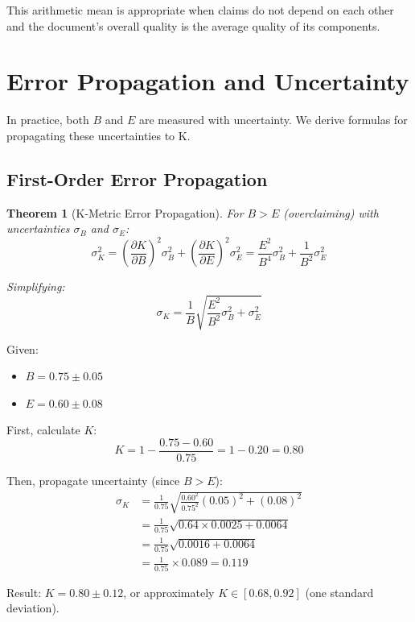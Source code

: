 \documentclass[11pt,a4paper]{article}
\newtheorem{theorem}{Theorem}[section]
\theoremstyle{remark}
\begin{document}
This arithmetic mean is appropriate when claims do not depend on each other and the document's overall quality is the average quality of its components.


\section{Error Propagation and Uncertainty}
\label{sec:error}

In practice, both $B$ and $E$ are measured with uncertainty. We derive formulas for propagating these uncertainties to K.

\subsection{First-Order Error Propagation}

\begin{theorem}[K-Metric Error Propagation]
\label{thm:error}
For $B > E$ (overclaiming) with uncertainties $\sigma_B$ and $\sigma_E$:
\begin{equation}
\sigma_K^2 = \left( \frac{\partial K}{\partial B} \right)^2 \sigma_B^2 + \left( \frac{\partial K}{\partial E} \right)^2 \sigma_E^2 = \frac{E^2}{B^4} \sigma_B^2 + \frac{1}{B^2} \sigma_E^2
\end{equation}

Simplifying:
\begin{equation}
\sigma_K = \frac{1}{B} \sqrt{\frac{E^2}{B^2} \sigma_B^2 + \sigma_E^2}
\end{equation}
\end{theorem}

\begin{examplebox}[title={Uncertainty Calculation}]
Given:
\begin{itemize}
    \item $B = 0.75 \pm 0.05$
    \item $E = 0.60 \pm 0.08$
\end{itemize}

First, calculate $K$:
\begin{equation}
K = 1 - \frac{0.75 - 0.60}{0.75} = 1 - 0.20 = 0.80
\end{equation}

Then, propagate uncertainty (since $B > E$):
\begin{align}
\sigma_K &= \frac{1}{0.75} \sqrt{\frac{0.60^2}{0.75^2} (0.05)^2 + (0.08)^2} \\
&= \frac{1}{0.75} \sqrt{0.64 \times 0.0025 + 0.0064} \\
&= \frac{1}{0.75} \sqrt{0.0016 + 0.0064} \\
&= \frac{1}{0.75} \times 0.089 = 0.119
\end{align}

Result: $K = 0.80 \pm 0.12$, or approximately $K \in [0.68, 0.92]$ (one standard deviation).
\end{examplebox}
\end{document}
